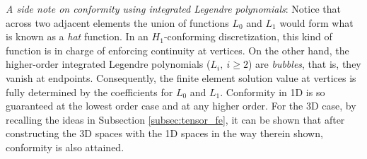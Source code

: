 {\color{blue}
\begin{remark}
\emph{A side note on conformity using integrated Legendre polynomials}: Notice that across two adjacent elements the union of functions $L_0$ and $L_1$ would form what is known as a \emph{hat} function. In an $H_1$-conforming discretization, this kind of function is in charge of enforcing continuity at vertices. On the other hand, the higher-order integrated Legendre polynomials ($L_i,\ i\geq2$) are \emph{bubbles}, that is, they vanish at endpoints. Consequently, the finite element solution value at vertices is fully determined by the coefficients for $L_0$ and $L_1$. Conformity in 1D is so guaranteed at the lowest order case and at any higher order. For the 3D case, by recalling the ideas in Subsection \ref{subsec:tensor_fe}, it can be shown that after constructing the 3D spaces with the 1D spaces in the way therein shown, conformity is also attained.
\end{remark}
}
